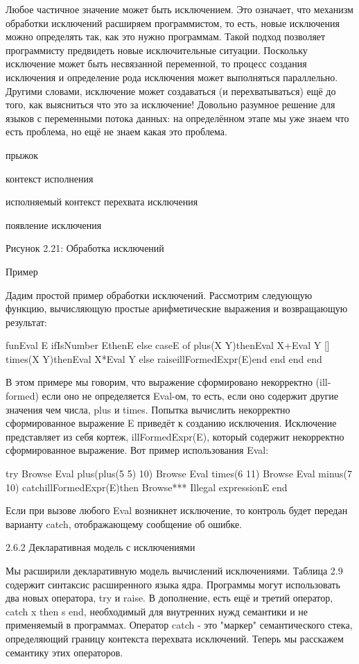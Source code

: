 Любое частичное значение может быть исключением. Это означает, что механизм обработки исключений расширяем программистом, то есть, новые исключения можно определять так, как это нужно программам. Такой подход позволяет программисту предвидеть новые исключительные ситуации. Поскольку исключение может быть несвязанной переменной, то процесс создания исключения и определение рода исключения может выполняться параллельно. Другими словами, исключение может создаваться (и перехватываться) ещё до того, как выясниться что это за исключение! Довольно разумное решение для языков с переменными потока данных: на определённом этапе мы уже знаем что есть проблема, но ещё не знаем какая это проблема.

прыжок

контекст исполнения

исполняемый контекст перехвата исключения

появление исключения

Рисунок 2.21: Обработка исключений

Пример

Дадим простой пример обработки исключений. Рассмотрим следующую функцию, вычисляющую простые арифметические выражения и возвращающую результат:

fun{Eval E}
if{IsNumber E}thenE
else
caseE
of plus(X Y)then{Eval X}+{Eval Y}
[] times(X Y)then{Eval X}*{Eval Y}
else raiseillFormedExpr(E)end
end
end
end

В этом примере мы говорим, что выражение сформировано некорректно (ill-formed) если оно не определяется Eval-ом, то есть, если оно содержит другие значения чем числа, plus и times. Попытка вычислить некорректно сформированное выражение E приведёт к созданию исключения. Исключение представляет из себя кортеж, illFormedExpr(E), который содержит некорректно сформированное выражение. Вот пример использования Eval:

try
{Browse {Eval plus(plus(5 5) 10)}}
{Browse {Eval times(6 11)}}
{Browse {Eval minus(7 10)}}
catchillFormedExpr(E)then
{Browse*** Illegal expressionE}
end

Если при вызове любого Eval возникнет исключение, то контроль будет передан варианту catch, отображающему сообщение об ошибке.

2.6.2 Декларативная модель с исключениями

Мы расширили декларативную модель вычислений исключениями. Таблица 2.9 содержит синтаксис расширенного языка ядра. Программы могут использовать два новых оператора, try и raise. В дополнение, есть ещё и третий оператор, catch x then s end, необходимый для внутренних нужд семантики и не применяемый в программах. Оператор catch - это "маркер" семантического стека, определяющий границу контекста перехвата исключений. Теперь мы расскажем семантику этих операторов.

